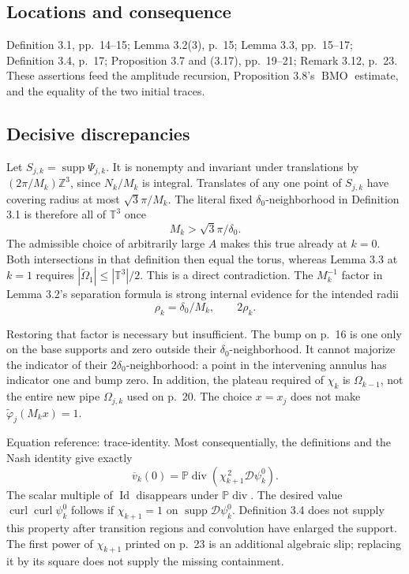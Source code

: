 \documentclass[10pt]{article}
\begin{document}
\subsection*{Locations and consequence}
Definition 3.1, pp. 14–15; Lemma 3.2(3), p. 15; Lemma 3.3, pp. 15–17; Definition 3.4, p. 17; Proposition 3.7 and (3.17), pp. 19–21; Remark 3.12, p. 23. These assertions feed the amplitude recursion, Proposition 3.8’s \(\operatorname{BMO}\) estimate, and the equality of the two initial traces.\par
\subsection*{Decisive discrepancies}
Let \(S_{j,k}=\operatorname{supp}\Psi_{j,k}\). It is nonempty and invariant under translations by \((2\pi/M_k)\mathbb Z^3\), since \(N_k/M_k\) is integral. Translates of any one point of \(S_{j,k}\) have covering radius at most \(\sqrt3\pi/M_k\). The literal fixed \(\delta_0\)-neighborhood in Definition 3.1 is therefore all of \(\mathbb T^3\) once \[M_k>\sqrt3\pi/\delta_0.\] The admissible choice of arbitrarily large \(A\) makes this true already at \(k=0\). Both intersections in that definition then equal the torus, whereas Lemma 3.3 at \(k=1\) requires \(|\widetilde\Omega_1|\leq|\mathbb T^3|/2\). This is a direct contradiction. The \(M_k^{-1}\) factor in Lemma 3.2’s separation formula is strong internal evidence for the intended radii \[\rho_k=\delta_0/M_k,\qquad 2\rho_k.\]\par
Restoring that factor is necessary but insufficient. The bump on p. 16 is one only on the base supports and zero outside their \(\delta_0\)-neighborhood. It cannot majorize the indicator of their \(2\delta_0\)-neighborhood: a point in the intervening annulus has indicator one and bump zero. In addition, the plateau required of \(\chi_k\) is \(\Omega_{k-1}\), not the entire new pipe \(\Omega_{j,k}\) used on p. 20. The choice \(x=x_j\) does not make \(\widetilde\varphi_j(M_kx)=1\).\par
Equation reference: trace-identity. Most consequentially, the definitions and the Nash identity give exactly \[
 \overline v_k(0)=\mathbb P\operatorname{div}\!\left(\chi_{k+1}^{\,2}\mathcal D\psi_k^0\right).\] The scalar multiple of \(\operatorname{Id}\) disappears under \(\mathbb P\operatorname{div}\). The desired value \(\operatorname{curl}\operatorname{curl}\psi_k^0\) follows if \(\chi_{k+1}=1\) on \(\operatorname{supp}\mathcal D\psi_k^0\). Definition 3.4 does not supply this property after transition regions and convolution have enlarged the support. The first power of \(\chi_{k+1}\) printed on p. 23 is an additional algebraic slip; replacing it by its square does not supply the missing containment.\par
\end{document}
